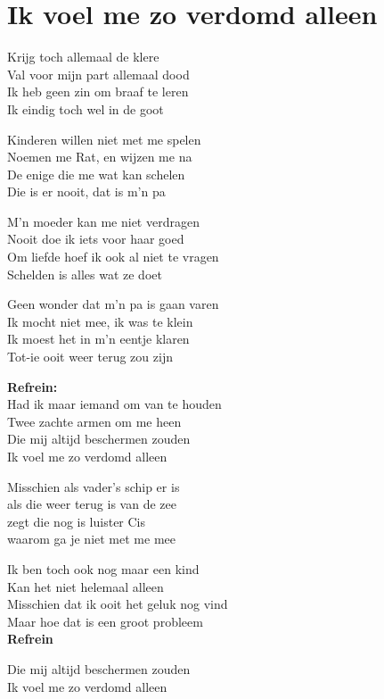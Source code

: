 \section{Ik voel me zo verdomd alleen}
Krijg toch allemaal de klere\\
Val voor mijn part allemaal dood\\
Ik heb geen zin om braaf te leren\\
Ik eindig toch wel in de goot

Kinderen willen niet met me spelen\\
Noemen me Rat, en wijzen me na\\
De enige die me wat kan schelen\\
Die is er nooit, dat is m'n pa

M'n moeder kan me niet verdragen\\
Nooit doe ik iets voor haar goed\\
Om liefde hoef ik ook al niet te vragen\\
Schelden is alles wat ze doet

Geen wonder dat m'n pa is gaan varen\\
Ik mocht niet mee, ik was te klein\\
Ik moest het in m'n eentje klaren\\
Tot-ie ooit weer terug zou zijn

\textbf{Refrein:}\\
Had ik maar iemand om van te houden\\
Twee zachte armen om me heen\\
Die mij altijd beschermen zouden\\
Ik voel me zo verdomd alleen

Misschien als vader's schip er is\\
als die weer terug is van de zee\\
zegt die nog is luister Cis\\
waarom ga je niet met me mee

Ik ben toch ook nog maar een kind\\
Kan het niet helemaal alleen\\
Misschien dat ik ooit het geluk nog vind\\
Maar hoe dat is een groot probleem\\

\textbf{Refrein}

Die mij altijd beschermen zouden\\
Ik voel me zo verdomd alleen
